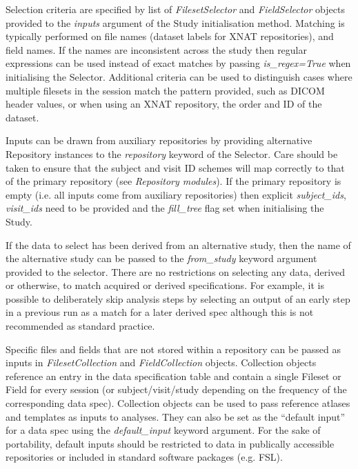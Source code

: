 Selection criteria are specified by list of \emph{FilesetSelector} and
\emph{FieldSelector} objects provided to the \emph{inputs} argument of
the Study initialisation method. Matching is typically performed on file
names (dataset labels for XNAT repositories), and field names. If the
names are inconsistent across the study then regular expressions can be
used instead of exact matches by passing \emph{is\_regex=True} when
initialising the Selector. Additional criteria can be used to
distinguish cases where multiple filesets in the session match the
pattern provided, such as DICOM header values, or when using an XNAT
repository, the order and ID of the dataset.

Inputs can be drawn from auxiliary repositories by providing alternative
Repository instances to the \emph{repository} keyword of the Selector.
Care should be taken to ensure that the subject and visit ID schemes
will map correctly to that of the primary repository (see
\emph{Repository modules}). If the primary repository is empty (i.e. all
inputs come from auxiliary repositories) then explicit
\emph{subject\_ids}, \emph{visit\_ids} need to be provided and the
\emph{fill\_tree} flag set when initialising the Study.

If the data to select has been derived from an alternative study, then
the name of the alternative study can be passed to the
\emph{from\_study} keyword argument provided to the selector. There are
no restrictions on selecting any data, derived or otherwise, to match
acquired or derived specifications. For example, it is possible to
deliberately skip analysis steps by selecting an output of an early step
in a previous run as a match for a later derived spec although this is
not recommended as standard practice.

Specific files and fields that are not stored within a repository can be
passed as inputs in \emph{FilesetCollection} and \emph{FieldCollection}
objects. Collection objects reference an entry in the data specification
table and contain a single Fileset or Field for every session (or
subject/visit/study depending on the frequency of the corresponding data
spec). Collection objects can be used to pass reference atlases and
templates as inputs to analyses. They can also be set as the ``default
input'' for a data spec using the \emph{default\_input} keyword
argument. For the sake of portability, default inputs should be
restricted to data in publically accessible repositories or included in
standard software packages (e.g. FSL).

